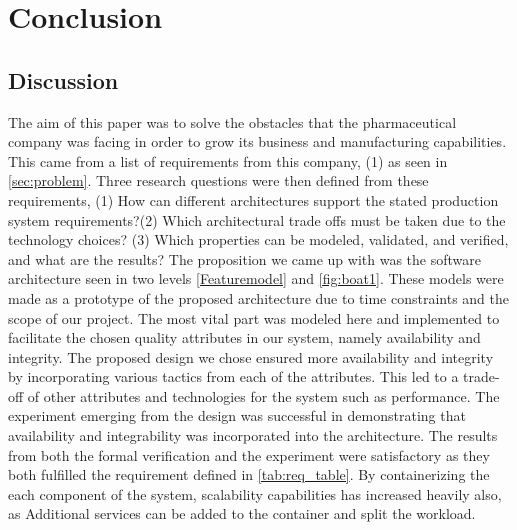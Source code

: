 \section{Conclusion}
\label{sec:conclusion}

\subsection{Discussion}
\label{sec:Discussion}
The aim of this paper was to solve the obstacles that the pharmaceutical company was facing in order to grow its business and manufacturing capabilities. This came from a list of requirements from this company, (1) as seen in \ref{sec:problem}. Three research questions were then defined from these requirements, (1) How can different architectures support the stated production system requirements?(2) Which architectural trade offs must be taken due to the technology choices? (3) Which properties can be modeled, validated, and verified, and what are the results? The proposition we came up with was the software architecture seen in two levels \ref{Featuremodel} and \ref{fig:boat1}. These models were made as a prototype of the proposed architecture due to time constraints and the scope of our project. The most vital part was modeled here and implemented to facilitate the chosen quality attributes in our system, namely availability and integrity. The proposed design we chose ensured more availability and integrity by incorporating various tactics from each of the attributes. This led to a trade-off of other attributes and technologies for the system such as performance. The experiment emerging from the design was successful in demonstrating that availability and integrability was incorporated into the architecture. The results from both the formal verification and the experiment were satisfactory as they both fulfilled the requirement defined in \ref{tab:req_table}. By containerizing the each component of the system, scalability capabilities has increased heavily also, as Additional services can be added to the container and split the workload.  



